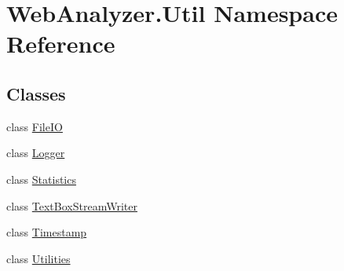 \hypertarget{namespace_web_analyzer_1_1_util}{}\section{Web\+Analyzer.\+Util Namespace Reference}
\label{namespace_web_analyzer_1_1_util}
\subsection*{Classes}
\begin{DoxyCompactItemize}
\item 
class \hyperlink{class_web_analyzer_1_1_util_1_1_file_i_o}{File\+I\+O}
\item 
class \hyperlink{class_web_analyzer_1_1_util_1_1_logger}{Logger}
\item 
class \hyperlink{class_web_analyzer_1_1_util_1_1_statistics}{Statistics}
\item 
class \hyperlink{class_web_analyzer_1_1_util_1_1_text_box_stream_writer}{Text\+Box\+Stream\+Writer}
\item 
class \hyperlink{class_web_analyzer_1_1_util_1_1_timestamp}{Timestamp}
\item 
class \hyperlink{class_web_analyzer_1_1_util_1_1_utilities}{Utilities}
\end{DoxyCompactItemize}
